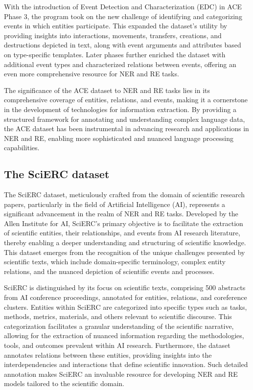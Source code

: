 With the introduction of Event Detection and Characterization (EDC) in ACE Phase 3, the program took on the new challenge of identifying and categorizing events in which entities participate. This expanded the dataset's utility by providing insights into interactions, movements, transfers, creations, and destructions depicted in text, along with event arguments and attributes based on type-specific templates. Later phases further enriched the dataset with additional event types and characterized relations between events, offering an even more comprehensive resource for NER and RE tasks.

The significance of the ACE dataset to NER and RE tasks lies in its comprehensive coverage of entities, relations, and events, making it a cornerstone in the development of technologies for information extraction. By providing a structured framework for annotating and understanding complex language data, the ACE dataset has been instrumental in advancing research and applications in NER and RE, enabling more sophisticated and nuanced language processing capabilities.
\subsection{The SciERC dataset}
The SciERC dataset, meticulously crafted from the domain of scientific research papers, particularly in the field of Artificial Intelligence (AI), represents a significant advancement in the realm of NER and RE tasks\cite{luan2018multitask}. Developed by the Allen Institute for AI, SciERC's primary objective is to facilitate the extraction of scientific entities, their relationships, and events from AI research literature, thereby enabling a deeper understanding and structuring of scientific knowledge. This dataset emerges from the recognition of the unique challenges presented by scientific texts, which include domain-specific terminology, complex entity relations, and the nuanced depiction of scientific events and processes.

SciERC is distinguished by its focus on scientific texts, comprising 500 abstracts from AI conference proceedings, annotated for entities, relations, and coreference clusters. Entities within SciERC are categorized into specific types such as tasks, methods, metrics, materials, and others relevant to scientific discourse. This categorization facilitates a granular understanding of the scientific narrative, allowing for the extraction of nuanced information regarding the methodologies, tools, and outcomes prevalent within AI research. Furthermore, the dataset annotates relations between these entities, providing insights into the interdependencies and interactions that define scientific innovation. Such detailed annotation makes SciERC an invaluable resource for developing NER and RE models tailored to the scientific domain.


